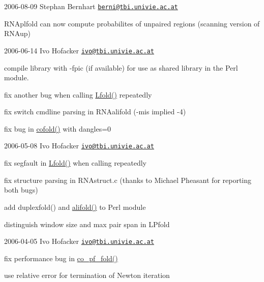2006-\/08-\/09 Stephan Bernhart \href{mailto:berni@tbi.univie.ac.at}{\tt berni@tbi.\+univie.\+ac.\+at}


\begin{DoxyItemize}
\item R\+N\+Aplfold can now compute probabilites of unpaired regions (scanning version of R\+N\+Aup)
\end{DoxyItemize}

2006-\/06-\/14 Ivo Hofacker \href{mailto:ivo@tbi.univie.ac.at}{\tt ivo@tbi.\+univie.\+ac.\+at}


\begin{DoxyItemize}
\item compile library with -\/fpic (if available) for use as shared library in the Perl module.
\item fix another bug when calling \hyperlink{group__local__mfe__fold_ga16e5a70e60835bb969eaecbe6482f1be}{Lfold()} repeatedly
\item fix switch cmdline parsing in R\+N\+Aalifold (-\/mis implied -\/4)
\item fix bug in \hyperlink{group__mfe__cofold_gabc8517f22cfe70595ee81fc837910d52}{cofold()} with dangles=0
\end{DoxyItemize}

2006-\/05-\/08 Ivo Hofacker \href{mailto:ivo@tbi.univie.ac.at}{\tt ivo@tbi.\+univie.\+ac.\+at}


\begin{DoxyItemize}
\item fix segfault in \hyperlink{group__local__mfe__fold_ga16e5a70e60835bb969eaecbe6482f1be}{Lfold()} when calling repeatedly
\item fix structure parsing in R\+N\+Astruct.\+c (thanks to Michael Pheasant for reporting both bugs)
\item add duplexfold() and \hyperlink{group__consensus__mfe__fold_ga4cf00f0659e5f0480335d69e797f05b1}{alifold()} to Perl module
\item distinguish window size and max pair span in L\+Pfold
\end{DoxyItemize}

2006-\/04-\/05 Ivo Hofacker \href{mailto:ivo@tbi.univie.ac.at}{\tt ivo@tbi.\+univie.\+ac.\+at}


\begin{DoxyItemize}
\item fix performance bug in \hyperlink{part__func__co_8h_ae5c1e7331718669bdae7a86de2be6184}{co\+\_\+pf\+\_\+fold()}
\item use relative error for termination of Newton iteration
\end{DoxyItemize}

